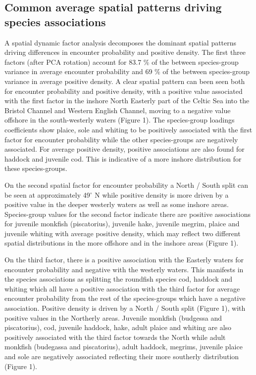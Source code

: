 \documentclass{nature}
\begin{document}
\begin{linenumbers}
\subsection{Common average spatial patterns driving species associations} A
spatial dynamic factor analysis decomposes the dominant spatial patterns
driving differences in encounter probability and positive density. The first
three factors (after PCA rotation) account for 83.7 \% of the between
species-group variance in average encounter probability and 69 \% of the
between species-group variance in average positive density. A clear spatial
pattern can been seen both for encounter probability and positive density, with
a positive value associated with the first factor in the inshore North Easterly
part of the Celtic Sea into the Bristol Channel and Western English Channel,
moving to a negative value offshore in the south-westerly waters (Figure 1).
The species-group loadings coefficients show plaice, sole and whiting to be
positively associated with the first factor for encounter probability while the
other species-groups are negatively associated. For average positive density,
positive associations are also found for haddock and juvenile cod. This is
indicative of a more inshore distribution for these species-groups. 

On the second spatial factor for encounter probability a North / South split
can be seen at approximately 49$^{\circ}$ N while positive density is more
driven by a positive value in the deeper westerly waters as well as some
inshore areas. Species-group values for the second factor indicate there are
positive associations for juvenile monkfish (piscatorius), juvenile hake,
juvenile megrim, plaice and juvenile whiting with average positive density,
which may reflect two different spatial distributions in the more offshore and
in the inshore areas (Figure 1).

On the third factor, there is a positive association with the Easterly waters
for encounter probability and negative with the westerly waters. This manifests
in the species associations as splitting the roundfish species cod, haddock and
whiting which all have a positive association with the third factor for average
encounter probability from the rest of the species-groups which have a negative
association. Positive density is driven by a North / South split (Figure 1),
with positive values in the Northerly areas. Juvenile monkfish (budgessa and
piscatorius), cod, juvenile haddock, hake, adult plaice and whiting are also
positively associated with the third factor towards the North while adult
monkfish (budegassa and piscatorius), adult haddock, megrims, juvenile plaice
and sole are negatively associated reflecting their more southerly distribution
(Figure 1).


\end{linenumbers}
\end{document}
